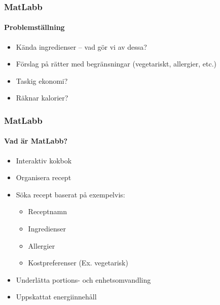 %
%

\begin{frame}
  \frametitle{MatLabb}
  \framesubtitle{Problemställning}
  \begin{itemize}
    \item<1-> Kända ingredienser -- vad gör vi av dessa?
    \item<2-> Förslag på rätter med begränsningar (vegetariskt, allergier, etc.)
    \item<3-> Taskig ekonomi? 
    \item<4-> Räknar kalorier?
  \end{itemize}
\end{frame}

\begin{frame}
  \frametitle{MatLabb}
  \framesubtitle{Vad är MatLabb?}
  \begin{itemize}
    \item<1-> Interaktiv kokbok
    \item<2-> Organisera recept
    \item<3-> Söka recept baserat på exempelvis:
      \begin{itemize}
        \item Receptnamn
        \item Ingredienser
        \item Allergier
        \item Kostpreferenser (Ex. vegetarisk)
      \end{itemize}
    \item<4-> Underlätta portions- och enhetsomvandling
    \item<5-> Uppskattat energiinnehåll
  \end{itemize}
\end{frame}
